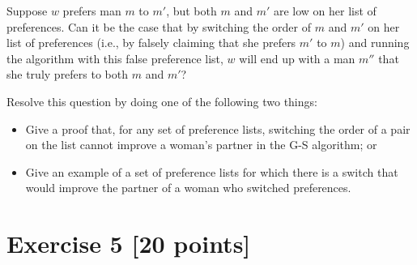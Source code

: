 \documentclass[11pt]{article}
\theoremstyle{theorem}
\theoremstyle{lemma}
\theoremstyle{corollary}
\theoremstyle{definition}
\begin{document}
 Suppose $w$ prefers man $m$ to $m'$, but both $m$ and $m'$ are low on her list of preferences. Can it be the case that by switching the order of $m$ and $m'$ on her list of preferences (i.e., by falsely claiming that she prefers $m'$ to $m$) and running the algorithm with this false preference list, $w$ will end up with a man $m''$ that she truly prefers to both $m$ and $m'$? 

 Resolve this question by doing one of the following two things:
 
\begin{itemize}
     \item   Give a proof that, for any set of preference lists, switching the order of a pair on the list cannot improve a woman's partner in the G-S algorithm; or

\item  Give an example of a set of preference lists for which there is a switch that would improve the partner of a woman who switched preferences.
\end{itemize}

 \section*{Exercise 5 [20 points]}
\end{document}
